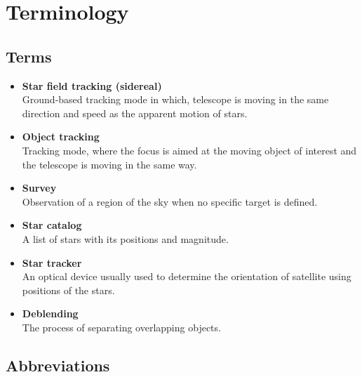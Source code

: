 \chapter*{Terminology}


\section*{Terms}

\begin{itemize}
    \setlength\itemsep{1px}
    \item \textbf{Star field tracking (sidereal)} \\
    Ground-based tracking mode in which, telescope is moving in the same direction and speed as the apparent motion of stars.
    
    \item \textbf{Object tracking} \\
    Tracking mode, where the focus is aimed at the moving object of interest and the telescope is moving in the same way. 

    \item \textbf{Survey} \\
    Observation of a region of the sky when no specific target is defined. 

    \item \textbf{Star catalog} \\
    A list of stars with its positions and magnitude. 

    \item \textbf{Star tracker} \\
    An optical device usually used to determine the orientation of satellite using positions of the stars. 
    
    \item \textbf{Deblending} \\
    The process of separating overlapping objects.
    
\end{itemize}

\section*{Abbreviations}


